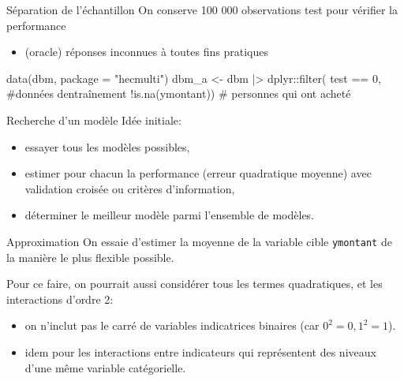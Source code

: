\documentclass[
  ignorenonframetext,
]{beamer}
\newenvironment{Shaded}{\begin{snugshade}}{\end{snugshade}}
\newcommand{\AttributeTok}[1]{\textcolor[rgb]{0.40,0.45,0.13}{#1}}
\newcommand{\CommentTok}[1]{\textcolor[rgb]{0.37,0.37,0.37}{#1}}
\newcommand{\DecValTok}[1]{\textcolor[rgb]{0.68,0.00,0.00}{#1}}
\newcommand{\FunctionTok}[1]{\textcolor[rgb]{0.28,0.35,0.67}{#1}}
\newcommand{\NormalTok}[1]{\textcolor[rgb]{0.00,0.23,0.31}{#1}}
\newcommand{\OtherTok}[1]{\textcolor[rgb]{0.00,0.23,0.31}{#1}}
\newcommand{\SpecialCharTok}[1]{\textcolor[rgb]{0.37,0.37,0.37}{#1}}
\newcommand{\StringTok}[1]{\textcolor[rgb]{0.13,0.47,0.30}{#1}}
\providecommand{\tightlist}{%
  \setlength{\itemsep}{0pt}\setlength{\parskip}{0pt}}\usepackage{longtable,booktabs,array}
\begin{document}
\begin{frame}[fragile]{Séparation de l'échantillon}
\protect\hypertarget{suxe9paration-de-luxe9chantillon}{}
On conserve 100 000 observations test pour vérifier la performance

\begin{itemize}
\tightlist
\item
  (oracle) réponses inconnues à toutes fins pratiques
\end{itemize}

\footnotesize

\begin{Shaded}
\begin{Highlighting}[numbers=left,,]
\FunctionTok{data}\NormalTok{(dbm, }\AttributeTok{package =} \StringTok{"hecmulti"}\NormalTok{)}
\NormalTok{dbm\_a }\OtherTok{\textless{}{-}}\NormalTok{ dbm }\SpecialCharTok{|\textgreater{}}
\NormalTok{  dplyr}\SpecialCharTok{::}\FunctionTok{filter}\NormalTok{(}
\NormalTok{    test }\SpecialCharTok{==} \DecValTok{0}\NormalTok{, }\CommentTok{\#données d\textquotesingle{}entraînement}
    \SpecialCharTok{!}\FunctionTok{is.na}\NormalTok{(ymontant)) }\CommentTok{\# personnes qui ont acheté}
\end{Highlighting}
\end{Shaded}

\normalsize
\end{frame}

\begin{frame}{Recherche d'un modèle}
\protect\hypertarget{recherche-dun-moduxe8le}{}
Idée initiale:

\begin{itemize}
\tightlist
\item
  essayer tous les modèles possibles,
\item
  estimer pour chacun la performance (erreur quadratique moyenne) avec
  validation croisée ou critères d'information,
\item
  déterminer le meilleur modèle parmi l'ensemble de modèles.
\end{itemize}
\end{frame}

\begin{frame}[fragile]{Approximation}
\protect\hypertarget{approximation}{}
On essaie d'estimer la moyenne de la variable cible \texttt{ymontant} de
la manière le plus flexible possible.

Pour ce faire, on pourrait aussi considérer tous les termes
quadratiques, et les interactions d'ordre 2:

\begin{itemize}
\tightlist
\item
  on n'inclut pas le carré de variables indicatrices binaires (car
  \(0^2=0, 1^2=1\)).
\item
  idem pour les interactions entre indicateurs qui représentent des
  niveaux d'une même variable catégorielle.
\end{itemize}
\end{frame}
\end{document}
